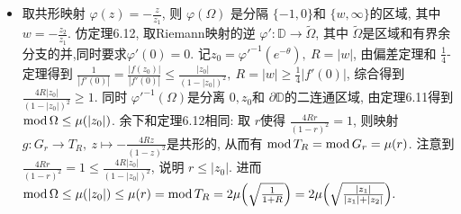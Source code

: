 \begin{itemize}
\item[6.3.4] 取共形映射 $\varphi(z) = -\frac{z}{z_1}$,  
则 $\varphi(\Omega)$ 是分隔 $\{-1,0\}$和  $\{w,\infty\}$的区域, 
其中 $w = -\frac{z_2}{z_1}$. 
仿定理6.12, 取Riemann映射的逆 $\varphi': \mathbb{D}\to \tilde{\Omega}$, 
其中 $\tilde{\Omega}$是区域和有界余分支的并,同时要求$\varphi'(0)=0$. 
记$z_0 = \varphi'^{-1}(e^{-\theta}),\ R = |w|$, 
由偏差定理和 $\frac{1}{4}$-定理得到
$\frac{1}{|f'(0)|} = \frac{|f(z_0)|}{|f'(0)|}\le \frac{|z_0|}{(1-|z_0|)^2},
\ R = |w|\ge \frac{1}{4}|f'(0)|$, 综合得到 $\frac{4R|z_0|}{(1-|z_0|)^2}\ge 1$. 
同时 $\varphi'^{-1}(\Omega)$是分离 ${0,z_0}$和 $\partial\mathbb{D}$的二连通区域,
由定理6.11得到 $\operatorname{mod}\Omega\le \mu(|z_0|)$. 
余下和定理6.12相同: 取 $r$使得 $\frac{4Rr}{(1-r)^2}=1$, 
则映射 $g:G_r\to T_R,\ z\mapsto -\frac{4Rz}{(1-z)^2}$是共形的, 
从而有 $\operatorname{mod} T_R = \operatorname{mod} G_r = \mu(r)$. 
注意到 $\frac{4Rr}{(1-r)^2}=1\le\frac{4R|z_0|}{(1-|z_0|)^2}$,  
说明 $r\le |z_0|$. 进而 $\operatorname{mod}\Omega\le \mu(|z_0|)
\le \mu(r) = \operatorname{mod} T_R = 2\mu\Big(\sqrt{\frac{1}{1+R}}\Big) 
= 2\mu\Big(\sqrt{\frac{|z_1|}{|z_1|+|z_2|}}\Big).$
    \end{itemize}